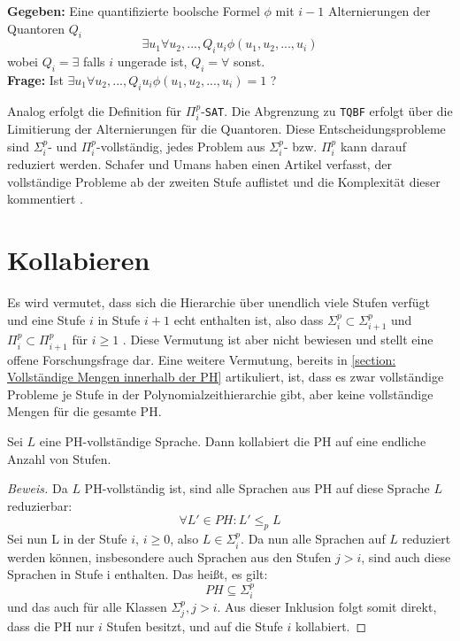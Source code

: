 \begin{definition} \cite{arora_computational_2009}
    \textbf{Gegeben:} Eine quantifizierte boolsche Formel $\phi$ mit $i-1$ Alternierungen der Quantoren $Q_i$ 
    $$
    \exists u_1 \forall u_2, ..., Q_i u_i \phi(u_1, u_2, ..., u_i)
    $$
    wobei $Q_i = \exists $ falls $i$ ungerade ist, $Q_i = \forall$ sonst. \\
    \textbf{Frage:} Ist $\exists u_1 \forall u_2, ..., Q_i u_i \phi(u_1, u_2, ..., u_i) = 1$ ?
\end{definition}

Analog erfolgt die Definition für $\Pi^p_i$-\texttt{SAT}. Die Abgrenzung zu \texttt{TQBF} erfolgt über die Limitierung der Alternierungen für die Quantoren.
Diese Entscheidungsprobleme sind $\Sigma^p_i$- und $\Pi^p_i$-vollständig, jedes Problem aus $\Sigma^p_i$- bzw. $\Pi^p_i$ kann darauf reduziert werden.
Schafer und Umans haben einen Artikel verfasst, der vollständige Probleme ab der zweiten Stufe auflistet und die Komplexität dieser kommentiert \cite{schaefer_completeness_nodate}.


\section{Kollabieren} \label{section: Kollabieren der PH}
Es wird vermutet, dass sich die Hierarchie über unendlich viele Stufen verfügt und eine Stufe $i$ in Stufe $i + 1$ echt enthalten ist,
also dass $\Sigma^p_i \subset \Sigma^p_{i+1}$ und $\Pi^p_i \subset \Pi^p_{i+1}$ für $i \geq 1$ \cite{arora_computational_2009}. Diese Vermutung ist aber nicht bewiesen und stellt eine offene
Forschungsfrage dar. Eine weitere Vermutung, bereits in \ref{section: Vollständige Mengen innerhalb der PH} artikuliert,  ist, dass es zwar vollständige Probleme je Stufe in der Polynomialzeithierarchie gibt, aber keine vollständige Mengen für die gesamte PH.
\begin{theorem}
    Sei $L$ eine PH-vollständige Sprache. Dann kollabiert die PH auf eine endliche Anzahl von Stufen. 
\end{theorem}

\begin{proof}[Beweis] \cite{arora_computational_2009}
    Da $L$ PH-vollständig ist, sind alle Sprachen aus PH auf diese Sprache $L$ reduzierbar:
    $$
    \forall L' \in PH: L' \leq_p L
    $$
    Sei nun L in der Stufe $i$, $i \geq 0$, also $L \in \Sigma^p_i$. Da nun alle Sprachen auf $L$ reduziert werden können, insbesondere
    auch Sprachen aus den Stufen $j > i$, sind auch diese Sprachen in Stufe i enthalten.
    Das heißt, es gilt: 
    $$
    PH \subseteq \Sigma^p_i
    $$ 
    und das auch für alle Klassen $\Sigma^p_j, j> i$.
    Aus dieser Inklusion folgt somit direkt, dass die PH nur $i$ Stufen besitzt, und auf die Stufe $i$ kollabiert.
\end{proof}

